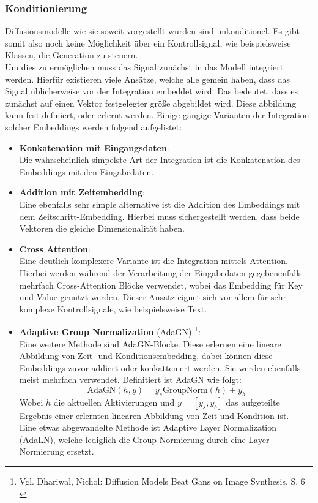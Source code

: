 \subsubsection{Konditionierung}

Diffusionsmodelle wie sie soweit vorgestellt wurden sind unkonditionel. Es gibt somit also noch keine Möglichkeit über ein Kontrollsignal, wie beispielsweise Klassen, die Generation zu steuern. \\
Um dies zu ermöglichen muss das Signal zunächst in das Modell integriert werden. Hierfür existieren viele Ansätze, welche alle gemein haben, dass das Signal üblicherweise vor der Integration embeddet wird. Das bedeutet, dass es zunächst auf einen Vektor festgelegter größe abgebildet wird. Diese abbildung kann fest definiert, oder erlernt werden. Einige gängige Varianten der Integration solcher Embeddings werden folgend aufgelistet:
\begin {itemize}
    \item \textbf{Konkatenation mit Eingangsdaten}: \\
    Die wahrscheinlich simpelste Art der Integration ist die Konkatenation des Embeddings mit den Eingabedaten.
    \item \textbf{Addition mit Zeitembedding}: \\
    Eine ebenfalls sehr simple alternative ist die Addition des Embeddings mit dem Zeitschritt-Embedding. Hierbei muss sichergestellt werden, dass beide Vektoren die gleiche Dimensionalität haben.
    \item \textbf{Cross Attention}: \\
    Eine deutlich komplexere Variante ist die Integration mittels Attention. Hierbei werden während der Verarbeitung der Eingabedaten gegebenenfalls mehrfach Cross-Attention Blöcke verwendet, wobei das Embedding für Key und Value genutzt werden. Dieser Ansatz eignet sich vor allem für sehr komplexe Kontrollsignale, wie beispielsweise Text.
    \item \textbf{Adaptive Group Normalization} (AdaGN) \footnote{
        Vgl. Dhariwal, Nichol: Diffusion Models Beat Gans on Image Synthesis, S. 6
        \cite{NEURIPS2021_49ad23d1}
    }: \\
    Eine weitere Methode sind AdaGN-Blöcke. Diese erlernen eine lineare Abbildung von Zeit- und Konditionsembedding, dabei können diese Embeddings zuvor addiert oder konkatteniert werden. Sie werden ebenfalls meist mehrfach verwendet. Definitiert ist AdaGN wie folgt:
    \begin{equation}
        \text{AdaGN}(h,y) = y_s \text{GroupNorm}(h) + y_b
    \end{equation}
    Wobei $h$ die aktuellen Aktivierungen und $y=[y_s, y_b]$ das aufgeteilte Ergebnis einer erlernten linearen Abbildung von Zeit und Kondition ist. \\
    Eine etwas abgewandelte Methode ist Adaptive Layer Normalization (AdaLN), welche lediglich die Group Normierung durch eine Layer Normierung ersetzt.

    
\end {itemize}  
